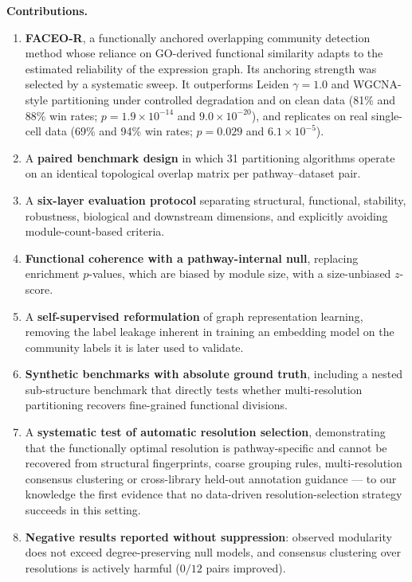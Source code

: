 \documentclass[twocolumn,10pt,a4paper]{article}
\begin{document}
\noindent\textbf{Contributions.} \begin{enumerate}
\item \textbf{FACEO-R}, a functionally anchored overlapping community detection method whose
reliance on GO-derived functional similarity adapts to the estimated reliability of the
expression graph. Its anchoring strength was selected by a systematic sweep. It outperforms
Leiden $\gamma=1.0$ and WGCNA-style partitioning
under controlled degradation and on clean data (81\% and 88\% win rates; $p = 1.9\times10^{-14}$ and
$9.0\times10^{-20}$), and replicates on real single-cell data (69\% and 94\% win rates;
$p = 0.029$ and $6.1\times10^{-5}$).
\item A \textbf{paired benchmark design} in which 31 partitioning algorithms operate on an
identical topological overlap matrix per pathway--dataset pair.
\item A \textbf{six-layer evaluation protocol} separating structural, functional,
stability, robustness, biological and downstream dimensions, and explicitly avoiding
module-count-based criteria.
\item \textbf{Functional coherence with a pathway-internal null}, replacing enrichment
$p$-values, which are biased by module size, with a size-unbiased $z$-score.
\item A \textbf{self-supervised reformulation} of graph representation learning, removing
the label leakage inherent in training an embedding model on the community labels it is
later used to validate.
\item \textbf{Synthetic benchmarks with absolute ground truth}, including a nested
sub-structure benchmark that directly tests whether multi-resolution partitioning recovers
fine-grained functional divisions.
\item A \textbf{systematic test of automatic resolution selection}, demonstrating that the
functionally optimal resolution is pathway-specific and cannot be recovered from structural
fingerprints, coarse grouping rules, multi-resolution consensus clustering or cross-library
held-out annotation guidance --- to our knowledge the first evidence that no data-driven
resolution-selection strategy succeeds in this setting.
\item \textbf{Negative results reported without suppression}: observed modularity does not
exceed degree-preserving null models, and consensus clustering over resolutions is actively
harmful ($0/12$ pairs improved).
\end{enumerate}
\end{document}
